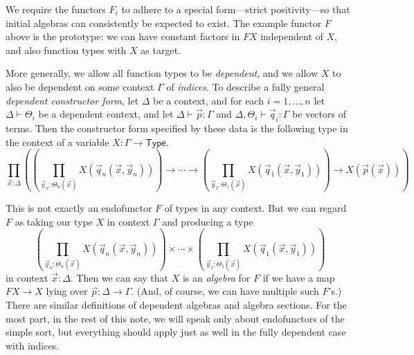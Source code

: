 \documentclass{amsart}
\begin{document}
We require the functors $F_i$ to adhere to a special form---strict positivity---so that initial algebras can consistently be expected to exist.  The example functor $F$ above is the prototype: we can have constant factors in $FX$ independent of $X$, and also function types with $X$ as target.

More generally, we allow all function types to be \emph{dependent}, and we allow $X$ to also be dependent on some context $\Gamma$ of \emph{indices}.  To describe a fully general \emph{dependent constructor form}, let $\Delta$ be a context, and for each $i=1,\dots,n$ let $\Delta\vdash\Theta_i$ be a dependent context, and let $\Delta\vdash \vec p:\Gamma$ and $\Delta,\Theta_i\vdash \vec q_i:\Gamma$ be vectors of terms.  Then the constructor form specified by these data is the following type in the context of a variable $X:\Gamma\to\mathsf{Type}$.
\begin{equation*}
  \prod_{\vec x:\Delta} \left(
  \left(\prod_{\vec y_n: \Theta_n(\vec x)} X(\vec q_n(\vec x, \vec y_n)) \right) \to 
  \cdots\to
  \left(\prod_{\vec y_1: \Theta_1(\vec x)} X(\vec q_1(\vec x, \vec y_1))\right) \to 
  X(\vec p(\vec x))\right)
\end{equation*}

This is not exactly an endofunctor $F$ of types in any context.  But we can regard $F$ as taking our type $X$ in context $\Gamma$ and producing a type
\[
  \left(\prod_{\vec y_n: \Theta_n(\vec x)} X(\vec q_n(\vec x, \vec y_n)) \right) \times
  \cdots\times
  \left(\prod_{\vec y_1: \Theta_1(\vec x)} X(\vec q_1(\vec x, \vec y_1))\right)
  \]
in context $\vec x:\Delta$.  Then we can say that $X$ is an \emph{algebra} for $F$ if we have a map $F X \to X$ lying over $\vec p:\Delta \to \Gamma$.  (And, of course, we can have multiple such $F$'s.)  There are similar definitions of dependent algebras and algebra sections.  For the most part, in the rest of this note, we will speak only about endofunctors of the simple sort, but everything should apply just as well in the fully dependent case with indices.
\end{document}
